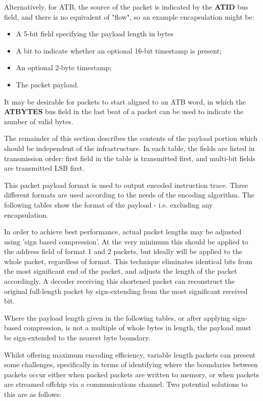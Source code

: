 Alternatively, for ATB, the source of the packet is indicated by the \textbf{ATID} bus field, and there is
no equivalent of "flow", so an example encapsulation might be:
\begin{itemize}
  \item A 5-bit field specifying the payload length in bytes
  \item A bit to indicate whether an optional 16-bit timestamp is present;
  \item An optional 2-byte timestamp;
  \item The packet payload.
\end{itemize}
It may be desirable for packets to start aligned to an ATB word, in which the \textbf{ATBYTES} bus field
in the last beat of a packet can be used to indicate the number of valid bytes.

The remainder of this section describes the contents of the payload
portion which should be independent of the infrastructure.  In each table, the fields are listed in
transmission order: first field in the table is transmitted first, and multi-bit fields are 
transmitted LSB first.

This packet payload format is used to output encoded instruction
trace.  Three different formats are used according to the needs of the
encoding algorithm. The following tables show the format of the
payload - i.e. excluding any encapsulation.

In order to achieve best performance, actual packet lengths may be adjusted using 'sign based compression'.
At the very minimum this should be applied to the address field of format 1 and 2 packets, but ideally will 
be applied to the whole packet, regardless of format.  This technique eliminates identical bits from the most 
significant end of the packet, and adjusts the length of the packet accordingly.  A decoder receiving this 
shortened packet can reconstruct the original full-length packet by sign-extending from the most significant
received bit.  

Where the payload length given in the following tables, or after applying sign-based compression, is not a 
multiple of whole bytes in length, the payload must be sign-extended to the nearest byte boundary.

Whilst offering maximum encoding efficiency, variable length packets can present some challenges,
specifically in terms of identifying where the boundaries between packets occur either when packed
packets are written to memory, or when packets are streamed offchip via a communications channel.  Two 
potential solutions to this are as follows:

